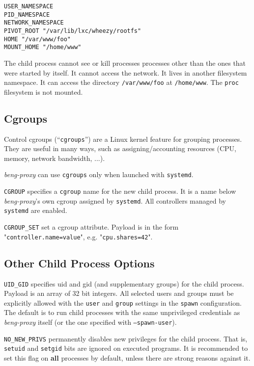\documentclass[a4paper,12pt]{article}
\begin{document}
\begin{verbatim}
USER_NAMESPACE
PID_NAMESPACE
NETWORK_NAMESPACE
PIVOT_ROOT "/var/lib/lxc/wheezy/rootfs"
HOME "/var/www/foo"
MOUNT_HOME "/home/www"
\end{verbatim}

The child process cannot see or kill processes processes other than
the ones that were started by itself.  It cannot access the network.
It lives in another filesystem namespace.  It can access the directory
\texttt{/var/www/foo} at \texttt{/home/www}.  The \texttt{proc}
filesystem is not mounted.

\subsection{Cgroups}
\label{cgroups}

Control cgroups (``\texttt{cgroups}'') are a Linux kernel feature for
grouping processes.  They are useful in many ways, such as
assigning/accounting resources (CPU, memory, network bandwidth, ...).

\emph{beng-proxy} can use \texttt{cgroups} only when launched with
\texttt{systemd}.

\verb|CGROUP| specifies a \texttt{cgroup} name for the new child
process.  It is a name below \emph{beng-proxy}'s own cgroup assigned
by \texttt{systemd}.  All controllers managed by \texttt{systemd} are
enabled.

\verb|CGROUP_SET| set a cgroup attribute.  Payload is in the form
"\texttt{controller.name=value}", e.g. "\texttt{cpu.shares=42}".

\subsection{Other Child Process Options}
\label{childoptions}

\verb|UID_GID| specifies uid and gid (and supplementary groups) for
the child process.  Payload is an array of 32 bit integers.  All
selected users and groups must be explicitly allowed with the
\texttt{user} and \texttt{group} settings in the \texttt{spawn}
configuration.
The default is to run child processes with the same unprivileged
credentials as \emph{beng-proxy} itself (or the one specified with
\texttt{--spawn-user}).

\verb|NO_NEW_PRIVS| permanently disables new privileges for the child
process.  That is, \texttt{setuid} and \texttt{setgid} bits are
ignored on executed programs.  It is recommended to set this flag on
\textbf{all} processes by default, unless there are strong reasons
against it.
\end{document}
